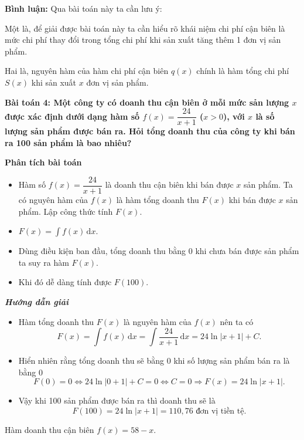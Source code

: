 \documentclass[12pt,a4paper]{article}
\newcommand{\dd}{\,\mathrm{d}}
\newcommand{\analysis}{\noindent\raisebox{0.15ex}{\rule{1.6ex}{1.6ex}}\hspace{4pt}\textbf{Phân tích bài toán}\par}
\newcommand{\solution}{\begin{center}\textbf{\textit{Hướng dẫn giải}}\end{center}\par}
\newcommand{\commenthead}{\textbf{Bình luận:} Qua bài toán này ta cần lưu ý:\par}
\begin{document}
\begin{commentbox}\commenthead
Một là, để giải được bài toán này ta cần hiểu rõ khái niệm chi phí cận biên là mức chi phí thay đổi trong tổng chi phí khi sản xuất tăng thêm 1 đơn vị sản phẩm.

Hai là, nguyên hàm của hàm chi phí cận biên $q(x)$ chính là hàm tổng chi phí $S(x)$ khi sản xuất $x$ đơn vị sản phẩm.

\end{commentbox}\textbf{Bài toán 4: Một công ty có doanh thu cận biên ở mỗi mức sản lượng $x$ được xác định dưới dạng hàm số $f(x)=\dfrac{24}{x+1}$ ($x>0$), với $x$ là số lượng sản phẩm được bán ra. Hỏi tổng doanh thu của công ty khi bán ra 100 sản phẩm là bao nhiêu?}\par\medskip
\begin{analysisbox}
\analysis
\begin{itemize}
\item Hàm số $f(x)=\dfrac{24}{x+1}$ là doanh thu cận biên khi bán được $x$ sản phẩm. Ta có nguyên hàm của $f(x)$ là hàm tổng doanh thu $F(x)$ khi bán được $x$ sản phẩm. Lập công thức tính $F(x)$.
\item $F(x)=\int f(x)\dd x$.
\item Dùng điều kiện ban đầu, tổng doanh thu bằng 0 khi chưa bán được sản phẩm ta suy ra hàm $F(x)$.
\item Khi đó dễ dàng tính được $F(100)$.
\end{itemize}
\end{analysisbox}

\solution
\begin{itemize}
\item Hàm tổng doanh thu $F(x)$ là nguyên hàm của $f(x)$ nên ta có
\[
F(x)=\int f(x)\dd x=\int\frac{24}{x+1}\dd x=24\ln|x+1|+C.
\]
\item Hiển nhiên rằng tổng doanh thu sẽ bằng 0 khi số lượng sản phẩm bán ra là bằng 0
\[
F(0)=0\Leftrightarrow24\ln|0+1|+C=0\Leftrightarrow C=0\Rightarrow F(x)=24\ln|x+1|.
\]
\item Vậy khi 100 sản phẩm được bán ra thì doanh thu sẽ là
\[
F(100)=24\ln|x+1|=110,76\text{ đơn vị tiền tệ}.
\]
\end{itemize}

Hàm doanh thu cận biên $f(x)=58-x$.
\end{document}
